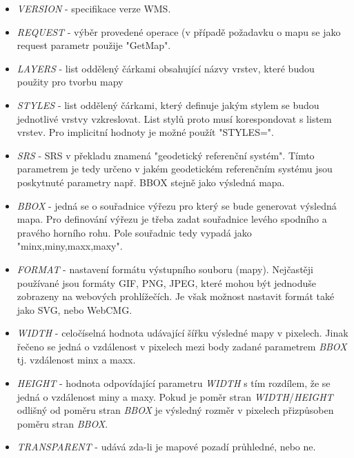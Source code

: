 \begin{itemize}
	\item\textit{VERSION} - specifikace verze WMS.
	
	\item\textit{REQUEST} - výběr provedené operace (v případě požadavku o mapu se jako request parametr použije "GetMap".
	
	\item\textit{LAYERS} - list oddělený čárkami obsahující názvy vrstev, které budou použity pro tvorbu mapy
	
	\item\textit{STYLES} - list oddělený čárkami, který definuje jakým stylem se budou jednotlivé vrstvy vzkreslovat. List stylů proto musí korespondovat s listem vrstev. Pro implicitní hodnoty je možné použít "STYLES=".
	
	\item\textit{SRS} - SRS v překladu znamená "geodetický referenční systém". Tímto parametrem je tedy určeno v jakém geodetickém referenčním systému jsou poskytnuté parametry např. BBOX stejně jako výsledná mapa. 
	
	\item\textit{BBOX} - jedná se o souřadnice výřezu pro který se bude generovat výsledná mapa. Pro definování výřezu je třeba zadat souřadnice levého spodního a pravého horního rohu. Pole souřadnic tedy vypadá jako "minx,miny,maxx,maxy".  
	
	\item\textit{FORMAT} - nastavení formátu výstupního souboru (mapy). Nejčastěji používané jsou formáty GIF, PNG, JPEG, které mohou být jednoduše zobrazeny na webových prohlížečích. Je však možnost nastavit formát také jako SVG, nebo WebCMG. 
	
	\item\textit{WIDTH} - celočíselná hodnota udávající šířku výsledné mapy v pixelech. Jinak řečeno se jedná o vzdálenost v pixelech mezi body zadané parametrem \textit{BBOX} tj. vzdálenost minx a maxx.
	
	\item\textit{HEIGHT} - hodnota odpovídající parametru \textit{WIDTH} s tím rozdílem, že se jedná o vzdálenost miny a maxy. Pokud je poměr stran \textit{WIDTH}/\textit{HEIGHT} odlišný od poměru stran \textit{BBOX} je výsledný rozměr v pixelech přizpůsoben poměru stran \textit{BBOX}.
	
	\item\textit{TRANSPARENT} - udává zda-li je mapové pozadí průhledné, nebo ne.  
\end{itemize}

